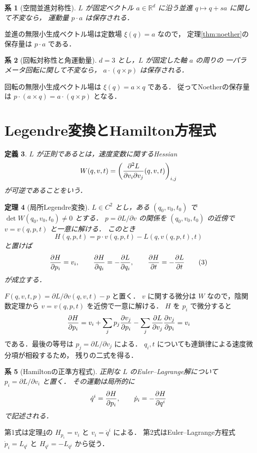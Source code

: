 \documentclass[a5paper,10pt,onecolumn]{jsarticle}
\makeatletter
\theoremstyle{mathnotetheorem}
\newtheorem{theorem}{定理}[section]
\newtheorem{definition}[theorem]{定義}
\newtheorem{corollary}[theorem]{系}
\renewcommand{\proofname}{証明}
\renewenvironment{proof}[1][\proofname]{%
  \par\pushQED{\qed}\normalfont\topsep4\p@\@plus2\p@\relax
  \trivlist\item[\hskip\labelsep\bfseries #1]\ignorespaces
}{\popQED\endtrivlist\@endpefalse}
\makeatother
\begin{document}
\begin{corollary}[空間並進対称性]
$L$ が固定ベクトル $a\in\mathbb R^d$ に沿う並進
$q\mapsto q+sa$ に関して不変なら，
運動量 $p\cdot a$ は保存される．
\end{corollary}
\begin{proof}
並進の無限小生成ベクトル場は定数場 $\xi(q)=a$ なので，
定理\ref{thm:noether}の保存量は $p\cdot a$ である．
\end{proof}
\begin{corollary}[回転対称性と角運動量]
$d=3$ とし，$L$ が固定した軸 $a$ の周りの
一パラメータ回転に関して不変なら，
$a\cdot(q\times p)$ は保存される．
\end{corollary}
\begin{proof}
回転の無限小生成ベクトル場は
$\xi(q)=a\times q$ である．
従ってNoetherの保存量は
$p\cdot(a\times q)=a\cdot(q\times p)$ となる．
\end{proof}

\section{Legendre変換とHamilton方程式}
\begin{definition}
$L$ が正則であるとは，速度変数に関するHessian
\[
 W(q,v,t)=\left(
 {\partial^2L\over\partial v_i\partial v_j}(q,v,t)
 \right)_{i,j}
\]
が可逆であることをいう．
\end{definition}
\begin{theorem}[局所Legendre変換]\label{thm:legendre}
$L\in C^2$ とし，ある $(q_0,v_0,t_0)$ で
$\det W(q_0,v_0,t_0)\ne0$ とする．
$p=\partial L/\partial v$ の関係を
$(q_0,v_0,t_0)$ の近傍で
$v=v(q,p,t)$ と一意に解ける．
このとき
\[
 H(q,p,t)=p\cdot v(q,p,t)-L(q,v(q,p,t),t)
\]
と置けば
\[
 {\partial H\over\partial p_i}=v_i,\qquad
 {\partial H\over\partial q_i}
 =-{\partial L\over\partial q_i},\qquad
 {\partial H\over\partial t}=-{\partial L\over\partial t}
 \tag{3}
\]
が成立する．
\end{theorem}
\begin{proof}
$F(q,v,t,p)=\partial L/\partial v(q,v,t)-p$ と置く．
$v$ に関する微分は $W$ なので，陰関数定理から
$v=v(q,p,t)$ を近傍で一意に解ける．
$H$ を $p_i$ で微分すると
\[
 {\partial H\over\partial p_i}
 =v_i+\sum_jp_j{\partial v_j\over\partial p_i}
 -\sum_j{\partial L\over\partial v_j}
  {\partial v_j\over\partial p_i}=v_i
\]
である．最後の等号は $p_j=\partial L/\partial v_j$ による．
$q_i,t$ についても連鎖律による速度微分項が相殺するため，
残りの二式を得る．
\end{proof}
\begin{corollary}[Hamiltonの正準方程式]
正則な $L$ のEuler--Lagrange解について
$p_i=\partial L/\partial v_i$ と置く．
その運動は局所的に
\[
 \dot q^i={\partial H\over\partial p_i},\qquad
 \dot p_i=-{\partial H\over\partial q^i}
\]
で記述される．
\end{corollary}
\begin{proof}
第1式は定理\ref{thm:legendre}の
$H_{p_i}=v_i$ と $v_i=\dot q^i$ による．
第2式はEuler--Lagrange方程式
$\dot p_i=L_{q^i}$ と $H_{q^i}=-L_{q^i}$ から従う．
\end{proof}
\end{document}
